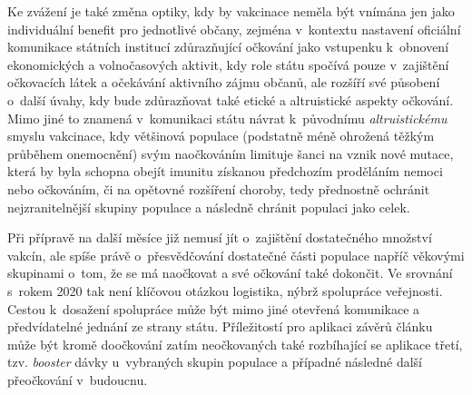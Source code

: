 Ke zvážení je také změna optiky, kdy by vakcinace neměla být vnímána jen jako individuální benefit pro jednotlivé občany, zejména v~kontextu nastavení oficiální komunikace státních institucí zdůrazňující očkování jako vstupenku k~obnovení ekonomických a volnočasových aktivit, kdy role státu spočívá pouze v~zajištění očkovacích látek a očekávání aktivního zájmu občanů, ale rozšíří své působení o~další úvahy, kdy bude zdůrazňovat také etické a altruistické aspekty očkování. %
Mimo jiné to znamená v~komunikaci státu návrat k~původnímu \emph{altruistickému} smyslu vakcinace, kdy většinová populace (podstatně méně ohrožená těžkým průběhem onemocnění) svým naočkováním limituje šanci na vznik nové mutace, která by byla schopna obejít imunitu získanou předchozím proděláním nemoci nebo očkováním, či na opětovné rozšíření choroby, tedy přednostně ochránit nejzranitelnější skupiny populace a ná\-sled\-ně chránit populaci jako celek. 


Při přípravě na další měsíce již nemusí jít o~zajištění dostatečného množství vakcín, ale spíše právě o~přesvědčování dostatečné části populace napříč věkovými skupinami o~tom, že se má naočkovat a své očkování také dokončit. Ve srovnání s~rokem 2020 tak není klíčovou otázkou logistika, nýbrž spolupráce veřejnosti. Cestou k~dosažení spolupráce může být mimo jiné otevřená komunikace a předvídatelné jednání ze strany státu. Příležitostí pro aplikaci závěrů článku může být kromě doočkování zatím neočkovaných také rozbíhající se aplikace třetí, tzv. \emph{booster} dávky u~vybraných skupin populace a případné následné další přeočkování v~budoucnu. 







